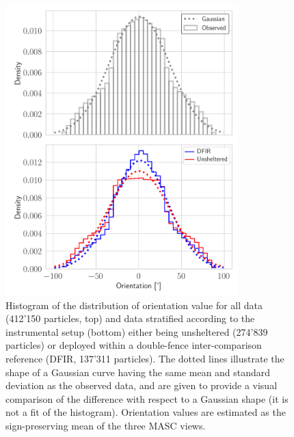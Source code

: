 \documentclass[draft]{agujournal2019}
\begin{document}
\begin{figure}
 \noindent \centering \includegraphics[width=0.8\textwidth]{Fig03.png}
\caption{Histogram of the distribution of orientation value for all data (412'150 particles, top) and data stratified according to the instrumental setup (bottom) either being unsheltered (274'839 particles) or deployed within a double-fence inter-comparison reference (DFIR, 137'311 particles). The dotted lines illustrate the shape of a Gaussian curve having the same mean and standard deviation as the observed data, and are given to provide a visual comparison of the difference with respect to a Gaussian shape (it is not a fit of the histogram). Orientation values are estimated as the sign-preserving mean of the three MASC views.   }
\label{fig:alldata}
\end{figure}
\end{document}
